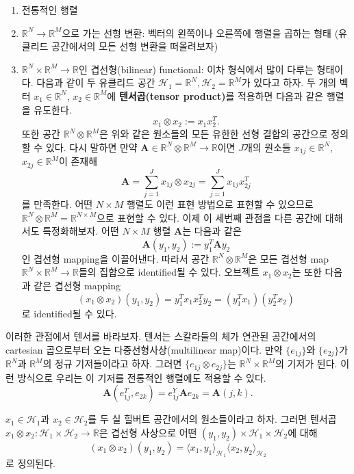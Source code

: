 \documentclass[b5paper,]{scrbook}
\theoremstyle{plain}
\theoremstyle{definition}
\numberwithin{equation}{section}
\let\BeginKnitrBlock\begin \let\EndKnitrBlock\end
\begin{document}
\begin{enumerate}
\def\labelenumi{\arabic{enumi}.}
\item
  전통적인 행렬
\item
  \(\mathbb{R}^{N}\rightarrow\mathbb{R}^{M}\)으로 가는 선형 변환: 벡터의 왼쪽이나 오른쪽에 행렬을 곱하는 형태 (유클리드 공간에서의 모든 선형 변환을 떠올려보자)
\item
  \(\mathbb{R}^{N}\times \mathbb{R}^{M}\rightarrow\mathbb{R}\)인 겹선형(bilinear) functional: 이차 형식에서 많이 다루는 형태이다. 다음과 같이 두 유클리드 공간 \(\mathcal{H}_{1}=\mathbb{R}^{N},\mathcal{H}_{2}=\mathbb{R}^{M}\)가 있다고 하자. 두 개의 벡터 \(x_{1}\in\mathbb{R}^{N}\), \(x_{2}\in\mathbb{R}^{M}\)에 \textbf{텐서곱(tensor product)}를 적용하면 다음과 같은 행렬을 유도한다.
  \[x_{1}\otimes x_{2}:=x_{1}x_{2}^{T}.\]
  또한 공간 \(\mathbb{R}^{N}\otimes \mathbb{R}^{M}\)은 위와 같은 원소들의 모든 유한한 선형 결합의 공간으로 정의할 수 있다. 다시 말하면 만약 \(\mathbf{A}\in\mathbb{R}^{N}\otimes \mathbb{R}^{M}\rightarrow\mathbb{R}\)이면 \(J\)개의 원소들 \(x_{1j}\in\mathbb{R}^{N}\), \(x_{2j}\in\mathbb{R}^{M}\)이 존재해
  \[\mathbf{A}=\sum_{j=1}^{J}x_{1j}\otimes x_{2j}=\sum_{j=1}^{J}x_{1j}x_{2j}^{T}\]
  를 만족한다. 어떤 \(N\times M\) 행렬도 이런 표현 방법으로 표현할 수 있으므로 \(\mathbb{R}^{N}\otimes \mathbb{R}^{M}=\mathbb{R}^{N\times M}\)으로 표현할 수 있다. 이제 이 세번째 관점을 다른 공간에 대해서도 특정화해보자. 어떤 \(N\times M\) 행렬 \(\mathbf{A}\)는 다음과 같은
  \[\mathbf{A}(y_{1},y_{2}):=y_{1}^{T}\mathbf{A}y_{2}\]
  인 겹선형 mapping을 이끌어낸다. 따라서 공간 \(\mathbb{R}^{N}\otimes \mathbb{R}^{M}\)은 모든 겹선형 map \(\mathbb{R}^{N}\times \mathbb{R}^{M}\rightarrow \mathbb{R}\)들의 집합으로 identified될 수 있다. 오브젝트 \(x_{1}\otimes x_{2}\)는 또한 다음과 같은 겹선형 mapping
  \[(x_{1}\otimes x_{2})(y_{1},y_{2})=y_{1}^{T}x_{1}x_{2}^{T}y_{2}=(y_{1}^{T}x_{1})(y_{2}^{T}x_{2})\]
  로 identified될 수 있다.
\end{enumerate}

이러한 관점에서 텐서를 바라보자. 텐서는 스칼라들의 체가 연관된 공간에서의 cartesian 곱으로부터 오는 다중선형사상(multilinear map)이다. 만약 \(\{e_{1j} \}\)와 \(\{e_{2j} \}\)가 \(\mathbb{R}^{N}\)과 \(\mathbb{R}^{M}\)의 정규 기저들이라고 하자. 그러면 \(\{e_{1j}\otimes e_{2j} \}\)는 \(\mathbb{R}^{N}\times \mathbb{R}^{M}\)의 기저가 된다. 이런 방식으로 우리는 이 기저를 전통적인 행렬에도 적용할 수 있다.
\[\mathbf{A}(e_{1j}^{T}, e_{2k})=e_{1j}^{Y}\mathbf{A}e_{2k}=\mathbf{A}(j,k).\]

\BeginKnitrBlock{definition}[힐버트 공간에서의 텝서곱]
\protect\hypertarget{def:unnamed-chunk-12}{}{\label{def:unnamed-chunk-12} {} }\(x_{1}\in\mathcal{H}_{1}\)과 \(x_{2}\in\mathcal{H}_{2}\)를 두 실 힐버트 공간에서의 원소들이라고 하자. 그러면 텐서곱 \(x_{1}\otimes x_{2}: \mathcal{H}_{1}\times\mathcal{H}_{2} \rightarrow\mathbb{R}\)은 겹선형 사상으로 어떤 \((y_{1},y_{2})\times \mathcal{H}_{1}\times \mathcal{H}_{2}\)에 대해
\[(x_{1}\otimes x_{2})(y_{1},y_{2})=\langle x_{1},y_{1}\rangle_{\mathcal{H}_{1}}\langle x_{2},y_{2}\rangle_{\mathcal{H}_{2}}\]
로 정의된다.
\EndKnitrBlock{definition}
\end{document}
